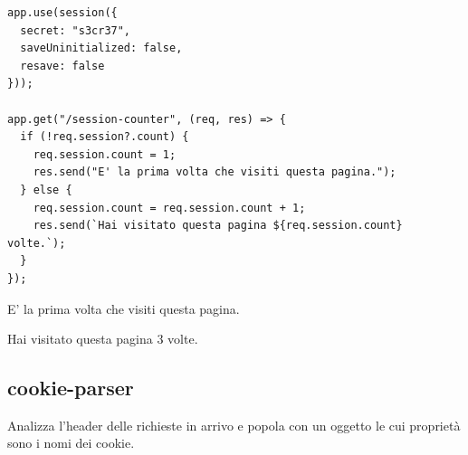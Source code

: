 \begin{affianco}[0.6][c]
\codicepiccolo
\begin{lstlisting}[style=js, name=session.js]
app.use(session({
  secret: "s3cr37",
  saveUninitialized: false,
  resave: false
}));

app.get("/session-counter", (req, res) => {
  if (!req.session?.count) {
    req.session.count = 1;
    res.send("E' la prima volta che visiti questa pagina.");
  } else {
    req.session.count = req.session.count + 1;
    res.send(`Hai visitato questa pagina ${req.session.count} volte.`);
  }
});
\end{lstlisting}
\risultato
\begin{browser}
  E' la prima volta che visiti questa pagina.
\end{browser}
\begin{browser}
  Hai visitato questa pagina 3 volte.
\end{browser}
\begin{immagine}
\end{immagine}
\end{affianco}


\subsection{cookie-parser}

Analizza l'header  delle richieste in arrivo e popola
 con un oggetto le cui proprietà sono i nomi dei cookie.

